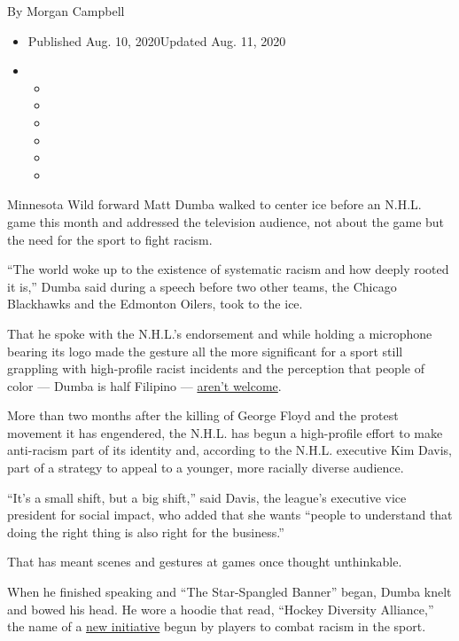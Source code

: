 By Morgan Campbell

\begin{itemize}
\item
  Published Aug. 10, 2020Updated Aug. 11, 2020
\item
  \begin{itemize}
  \item
  \item
  \item
  \item
  \item
  \item
  \end{itemize}
\end{itemize}

Minnesota Wild forward Matt Dumba walked to center ice before an N.H.L.
game this month and addressed the television audience, not about the
game but the need for the sport to fight racism.

``The world woke up to the existence of systematic racism and how deeply
rooted it is,'' Dumba said during a speech before two other teams, the
Chicago Blackhawks and the Edmonton Oilers, took to the ice.

That he spoke with the N.H.L.'s endorsement and while holding a
microphone bearing its logo made the gesture all the more significant
for a sport still grappling with high-profile racist incidents and the
perception that people of color --- Dumba is half Filipino ---
\href{https://www.nytimes3xbfgragh.onion/2020/04/17/sports/hockey/rangers-kandre-miller-zoom-racism.html?action=click\&module=RelatedLinks\&pgtype=Article}{aren't
welcome}.

More than two months after the killing of George Floyd and the protest
movement it has engendered, the N.H.L. has begun a high-profile effort
to make anti-racism part of its identity and, according to the N.H.L.
executive Kim Davis, part of a strategy to appeal to a younger, more
racially diverse audience.

``It's a small shift, but a big shift,'' said Davis, the league's
executive vice president for social impact, who added that she wants
``people to understand that doing the right thing is also right for the
business.''

That has meant scenes and gestures at games once thought unthinkable.

When he finished speaking and ``The Star-Spangled Banner'' began, Dumba
knelt and bowed his head. He wore a hoodie that read, ``Hockey Diversity
Alliance,'' the name of a
\href{https://www.nytimes3xbfgragh.onion/2020/06/08/sports/hockey/nhl-hockey-diversity-alliance.html}{new
initiative} begun by players to combat racism in the sport.

